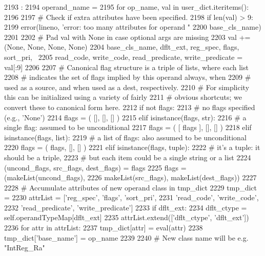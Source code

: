 \begin{DoxyCode}
2193                                                     :
2194         operand_name = {}
2195         for op_name, val in user_dict.iteritems():
2196 
2197             # Check if extra attributes have been specified.
2198             if len(val) > 9:
2199                 error(lineno, 'error: too many attributes for operand "%
2200                       base_cls_name)
2201 
2202             # Pad val with None in case optional args are missing
2203             val += (None, None, None, None)
2204             base_cls_name, dflt_ext, reg_spec, flags, sort_pri, \
2205             read_code, write_code, read_predicate, write_predicate = val[:9]
2206 
2207             # Canonical flag structure is a triple of lists, where each list
2208             # indicates the set of flags implied by this operand always, when
2209             # used as a source, and when used as a dest, respectively.
2210             # For simplicity this can be initialized using a variety of fairly
2211             # obvious shortcuts; we convert these to canonical form here.
2212             if not flags:
2213                 # no flags specified (e.g., 'None')
2214                 flags = ( [], [], [] )
2215             elif isinstance(flags, str):
2216                 # a single flag: assumed to be unconditional
2217                 flags = ( [ flags ], [], [] )
2218             elif isinstance(flags, list):
2219                 # a list of flags: also assumed to be unconditional
2220                 flags = ( flags, [], [] )
2221             elif isinstance(flags, tuple):
2222                 # it's a tuple: it should be a triple,
2223                 # but each item could be a single string or a list
2224                 (uncond_flags, src_flags, dest_flags) = flags
2225                 flags = (makeList(uncond_flags),
2226                          makeList(src_flags), makeList(dest_flags))
2227 
2228             # Accumulate attributes of new operand class in tmp_dict
2229             tmp_dict = {}
2230             attrList = ['reg_spec', 'flags', 'sort_pri',
2231                         'read_code', 'write_code',
2232                         'read_predicate', 'write_predicate']
2233             if dflt_ext:
2234                 dflt_ctype = self.operandTypeMap[dflt_ext]
2235                 attrList.extend(['dflt_ctype', 'dflt_ext'])
2236             for attr in attrList:
2237                 tmp_dict[attr] = eval(attr)
2238             tmp_dict['base_name'] = op_name
2239 
2240             # New class name will be e.g. "IntReg_Ra"

\end{DoxyCode}
